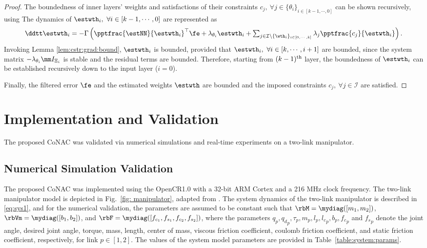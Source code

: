 \documentclass[final,5p,times,twocolumn,authoryear]{elsarticle}
\begin{document}
\begin{proof}
The boundedness of inner layers' weights and satisfactions of their constraints $c_j,\ \forall j\in\{\theta_i\}_{i\in[k-1,\cdots,0]}$ can be shown recursively, using \cite[Chap.~4 T.~1.9]{Desoer:2009aa}
The dynamics of $\estwth_i,\ \forall i\in[k-1,\cdots,0]$ are represented as
\begin{equation}
    \ddtt \estwth_i 
    =
    -\Gamma
    \left(
        \pptfrac{\estNN}{\estwth_i}^\top
        \fe
        +
        \lambda_{\theta_i}\estwth_i
        +
        \textstyle\sum_{
            j\in\mathcal{I}\setminus \{\wth_i\}_{i\in[0,\cdots,k]}
        }
        \lambda_j
        \pptfrac{c_j}{\estwth_i}
    \right)
    .
\end{equation}
Invoking Lemma \ref{lem:cstr:grad:bound}, $\estwth_i$ is bounded, provided that $\estwth_i,\ \forall i\in[k,\cdots,i+1]$ are bounded, since the system matrix $-\lambda_{\theta_i} \mm I_{\Xi_i}$ is stable and the residual terms are bounded.
Therefore, starting from $(k-1)\textsuperscript{th}$ layer, the boundedness of $\estwth_i$ can be established recursively down to the input layer ($i=0$).

\hfill

Finally, the filtered error $\fe$ and the estimated weights $\estwth$ are bounded and the imposed constraints $c_j,\ \forall j\in\mathcal I$ are satisfied.

\end{proof}

\section{Implementation and Validation}\label{sec:sim}

The proposed CoNAC was validated via numerical simulations and real-time experiments on a two-link manipulator.

\subsection{Numerical Simulation Validation}

The proposed CoNAC was implemented using the OpenCR1.0 \cite{opencr} with a 32-bit ARM Cortex and a 216 MHz clock frequency.
The two-link manipulator model is depicted in Fig.~\ref{fig: manipulator}, adapted from \cite{Markus:2013aa}. 
The system dynamics of the two-link manipulator is described in \eqref{eq:sys1}, and for the numerical validation, the parameters are assumed to be constant such that $\rbM=\mydiag([m_1,m_2])$, $\rbVm=\mydiag([b_1,b_2])$, and $\rbF=\mydiag([f_{c_1},f_{s_1},f_{c_2},f_{s_2}])$,
where the parameters $q_p,{q_d}_p,\tau_p,m_p,l_p,{l_c}_p,b_p,{f_c}_p$ and ${f_s}_p$ denote the joint angle, desired joint angle, torque, mass, length, center of mass, viscous friction coefficient, coulomb friction coefficient, and static friction coefficient, respectively, for link $p\in[1,2]$.
The values of the system model parameters are provided in Table~\ref{table:system:params}. 
\end{document}

